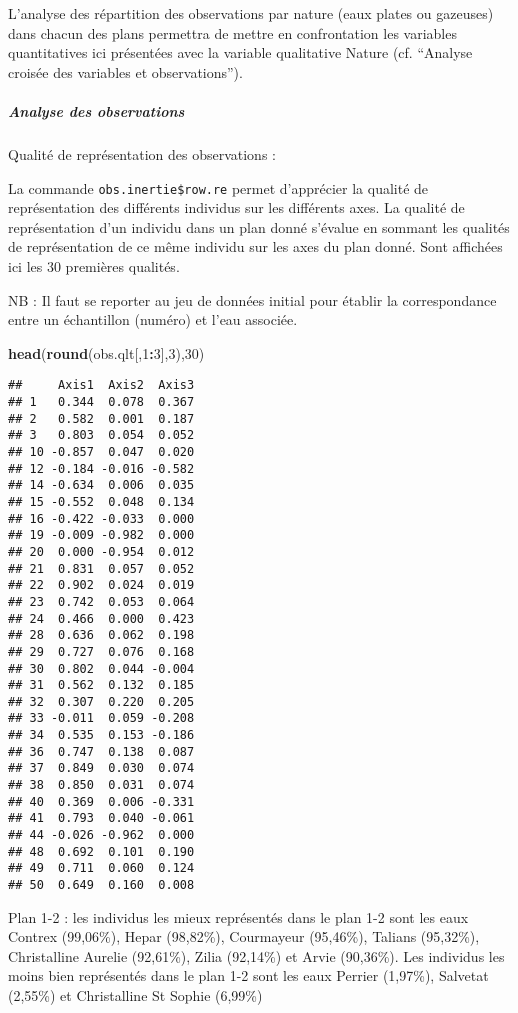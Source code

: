 \documentclass[]{article}
\newenvironment{Shaded}{\begin{snugshade}}{\end{snugshade}}
\newcommand{\KeywordTok}[1]{\textcolor[rgb]{0.13,0.29,0.53}{\textbf{#1}}}
\newcommand{\DecValTok}[1]{\textcolor[rgb]{0.00,0.00,0.81}{#1}}
\newcommand{\OperatorTok}[1]{\textcolor[rgb]{0.81,0.36,0.00}{\textbf{#1}}}
\newcommand{\NormalTok}[1]{#1}
\let\oldsubparagraph\subparagraph
\renewcommand{\subparagraph}[1]{\oldsubparagraph{#1}\mbox{}}
\begin{document}
L'analyse des répartition des observations par nature (eaux plates ou
gazeuses) dans chacun des plans permettra de mettre en confrontation les
variables quantitatives ici présentées avec la variable qualitative
Nature (cf. ``Analyse croisée des variables et observations'').

\subparagraph{\texorpdfstring{Analyse des
observations}{ Analyse des observations}}\label{analyse-des-observations}

Qualité de représentation des observations :

La commande \texttt{obs.inertie\$row.re} permet d'apprécier la qualité
de représentation des différents individus sur les différents axes. La
qualité de représentation d'un individu dans un plan donné s'évalue en
sommant les qualités de représentation de ce même individu sur les axes
du plan donné. Sont affichées ici les 30 premières qualités.

NB : Il faut se reporter au jeu de données initial pour établir la
correspondance entre un échantillon (numéro) et l'eau associée.

\begin{Shaded}
\begin{Highlighting}[]
\KeywordTok{head}\NormalTok{(}\KeywordTok{round}\NormalTok{(obs.qlt[,}\DecValTok{1}\OperatorTok{:}\DecValTok{3}\NormalTok{],}\DecValTok{3}\NormalTok{),}\DecValTok{30}\NormalTok{)}
\end{Highlighting}
\end{Shaded}

\begin{verbatim}
##     Axis1  Axis2  Axis3
## 1   0.344  0.078  0.367
## 2   0.582  0.001  0.187
## 3   0.803  0.054  0.052
## 10 -0.857  0.047  0.020
## 12 -0.184 -0.016 -0.582
## 14 -0.634  0.006  0.035
## 15 -0.552  0.048  0.134
## 16 -0.422 -0.033  0.000
## 19 -0.009 -0.982  0.000
## 20  0.000 -0.954  0.012
## 21  0.831  0.057  0.052
## 22  0.902  0.024  0.019
## 23  0.742  0.053  0.064
## 24  0.466  0.000  0.423
## 28  0.636  0.062  0.198
## 29  0.727  0.076  0.168
## 30  0.802  0.044 -0.004
## 31  0.562  0.132  0.185
## 32  0.307  0.220  0.205
## 33 -0.011  0.059 -0.208
## 34  0.535  0.153 -0.186
## 36  0.747  0.138  0.087
## 37  0.849  0.030  0.074
## 38  0.850  0.031  0.074
## 40  0.369  0.006 -0.331
## 41  0.793  0.040 -0.061
## 44 -0.026 -0.962  0.000
## 48  0.692  0.101  0.190
## 49  0.711  0.060  0.124
## 50  0.649  0.160  0.008
\end{verbatim}

Plan 1-2 : les individus les mieux représentés dans le plan 1-2 sont les
eaux Contrex (99,06\%), Hepar (98,82\%), Courmayeur (95,46\%), Talians
(95,32\%), Christalline Aurelie (92,61\%), Zilia (92,14\%) et Arvie
(90,36\%). Les individus les moins bien représentés dans le plan 1-2
sont les eaux Perrier (1,97\%), Salvetat (2,55\%) et Christalline St
Sophie (6,99\%)
\end{document}
